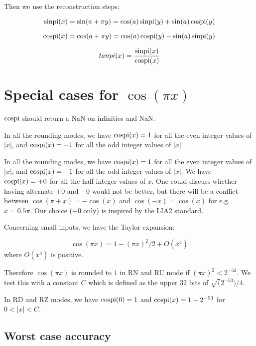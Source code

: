 Then we use the reconstruction steps:

\begin{equation}
  \operatorname{sinpi}(x) = \sin(a + \pi y) =  \cos(a) \operatorname{sinpi}(y) +  \sin(a) \operatorname{cospi}(y)
  \label{eq:sinpiapy}
\end{equation}

\begin{equation}
  \operatorname{cospi}(x) = \cos(a + \pi y) = \cos(a) \operatorname{cospi}(y) -  \sin(a) \operatorname{sinpi}(y)
  \label{eq:cospiapy}
\end{equation}

\begin{equation}
  tanpi(x) = \frac{\operatorname{sinpi}(x)}{\operatorname{cospi}(x)}
  \label{eq:tanpiapy}
\end{equation}



\section{Special cases for $\cos(\pi x)$ }

$\operatorname{cospi}$ should return a NaN on infinities and NaN.

In all the rounding modes, we have $\operatorname{cospi}(x)=1$ for all the even integer
 values of $|x|$, and $\operatorname{cospi}(x)=-1$ for all the odd integer values of
 $|x|$.


 In all the rounding modes, we have $\operatorname{cospi}(x)=1$ for all the even
 integer values of $|x|$, and $\operatorname{cospi}(x)=-1$ for all the odd integer
 values of $|x|$. We have $\operatorname{cospi}(x)=+0$ for all the half-integer
 values of $x$. One could discuss whether having alternate $+0$ and
 $-0$ would not be better, but there will be a conflict between
 $\cos(\pi+x)=-\cos(x)$ and $\cos(-x)=\cos(x)$ for e.g. $x=0.5\pi$.
 Our choice ($+0$ only) is inspired by the LIA2 standard.


 Concerning small inputs, we have the Taylor expansion:

  \begin{equation}
    \cos(\pi x) = 1-(\pi x)^2/2 + O(x^4)\label{eq:cospiTaylor}
  \end{equation}
 where $O(x^4)$ is positive.

 Therefore $\cos(\pi x)$ is rounded to $1$ in RN and RU mode if $(\pi
 x)^2<{2^{-53}}$. We test this with a constant $C$ which is defined as
 the upper 32 bits of $\sqrt(2^{-53})/4$.

 In RD and RZ modes, we have $\operatorname{cospi}(0)=1$ and $\operatorname{cospi}(x)=1-2^{-53}$
 for $0<|x|<C$.

\subsection{Worst case accuracy}


